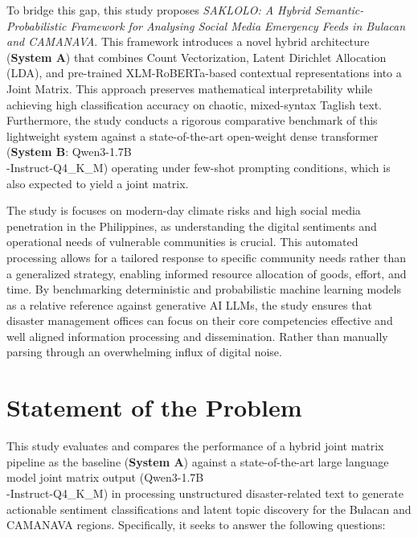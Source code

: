 \documentclass[12pt,a4paper]{report}
\newcommand{\sysA}{\textbf{System A}}
\newcommand{\sysB}{\textbf{System B}}
\newcommand{\xlmr}{XLM-RoBERTa}
\begin{document}
To bridge this gap, this study proposes \emph{SAKLOLO: A Hybrid
Semantic-Probabilistic Framework for Analysing Social Media Emergency Feeds in
Bulacan and CAMANAVA}. This framework introduces a novel hybrid architecture
(\sysA) that combines Count Vectorization, Latent Dirichlet Allocation (LDA),
and pre-trained \xlmr-based contextual representations into a Joint Matrix.
This approach preserves mathematical interpretability while achieving high
classification accuracy on chaotic, mixed-syntax Taglish text. Furthermore,
the study conducts a rigorous comparative benchmark of this lightweight system
against a state-of-the-art open-weight dense transformer (\sysB: Qwen3-1.7B\\
-Instruct-Q4\_K\_M) operating under few-shot prompting conditions, 
which is also expected to yield a joint matrix.

The study is focuses on modern-day climate risks and high social media
penetration in the Philippines, as understanding the digital sentiments and
operational needs of vulnerable communities is crucial. This automated
processing allows for a tailored response to specific community needs rather
than a generalized strategy, enabling informed resource allocation of goods,
effort, and time. By benchmarking deterministic and probabilistic machine
learning models as a relative reference against generative AI LLMs, the study ensures that
disaster management offices can focus on their core competencies effective and well aligned 
information processing and dissemination. Rather than manually parsing through an overwhelming
influx of digital noise.

\section{Statement of the Problem}

This study evaluates and compares the performance of a hybrid joint matrix
pipeline as the baseline (\sysA) against a state-of-the-art large language
model joint matrix output (Qwen3-1.7B\\-Instruct-Q4\_K\_M) in processing unstructured disaster-related
text to generate actionable sentiment classifications and latent topic
discovery for the Bulacan and CAMANAVA regions. Specifically, it seeks to
answer the following questions:
\end{document}
